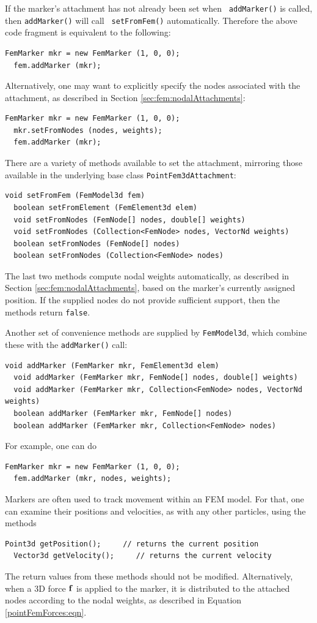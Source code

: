 If the marker's attachment has not already been set when {\tt
addMarker()} is called, then {\tt addMarker()} will call {\tt
setFromFem()} automatically. Therefore the above code fragment is
equivalent to the following:
%
\begin{lstlisting}[]
  FemMarker mkr = new FemMarker (1, 0, 0);
  fem.addMarker (mkr);
\end{lstlisting}
%
Alternatively, one may want to explicitly specify the nodes
associated with the attachment, as described in Section 
\ref{sec:fem:nodalAttachments}:
%
\begin{lstlisting}[]
  FemMarker mkr = new FemMarker (1, 0, 0);
  mkr.setFromNodes (nodes, weights);
  fem.addMarker (mkr);
\end{lstlisting}
%
There are a variety of methods available to set the attachment, mirroring
those available in the underlying base class {\tt PointFem3dAttachment}:
\begin{lstlisting}[]
  void setFromFem (FemModel3d fem)
  boolean setFromElement (FemElement3d elem)
  void setFromNodes (FemNode[] nodes, double[] weights)
  void setFromNodes (Collection<FemNode> nodes, VectorNd weights)
  boolean setFromNodes (FemNode[] nodes)
  boolean setFromNodes (Collection<FemNode> nodes)
\end{lstlisting}
The last two methods compute nodal weights automatically, as described
in Section \ref{sec:fem:nodalAttachments}, based on the marker's
currently assigned position. If the supplied nodes do not provide
sufficient support, then the methods return {\tt false}.

Another set of convenience methods are supplied by {\tt FemModel3d},
which combine these with the {\tt addMarker()} call:
%
\begin{lstlisting}[]
  void addMarker (FemMarker mkr, FemElement3d elem)
  void addMarker (FemMarker mkr, FemNode[] nodes, double[] weights)
  void addMarker (FemMarker mkr, Collection<FemNode> nodes, VectorNd weights)
  boolean addMarker (FemMarker mkr, FemNode[] nodes)
  boolean addMarker (FemMarker mkr, Collection<FemNode> nodes)
\end{lstlisting}
%
For example, one can do
%
\begin{lstlisting}[]
  FemMarker mkr = new FemMarker (1, 0, 0);
  fem.addMarker (mkr, nodes, weights);
\end{lstlisting}
%

Markers are often used to track movement within an FEM model.
For that, one can examine their positions and velocities,
as with any other particles, using the methods
%
\begin{lstlisting}[]
  Point3d getPosition();     // returns the current position
  Vector3d getVelocity();     // returns the current velocity
\end{lstlisting}
%
The return values from these methods should not be
modified. Alternatively, when a 3D force ${\bf f}$ is applied to the
marker, it is distributed to the attached nodes according to the nodal
weights, as described in Equation \eqref{pointFemForces:eqn}.


